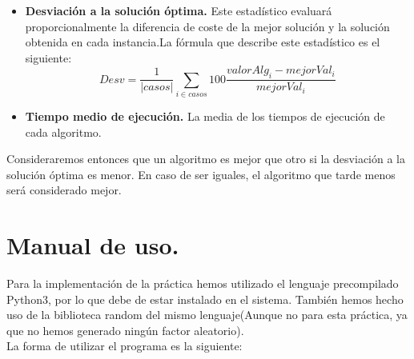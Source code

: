 \begin{itemize}
	\item \textbf{Desviación a la solución óptima.} Este estadístico evaluará proporcionalmente la diferencia de coste de la mejor solución y la solución obtenida en cada instancia.La fórmula que describe este estadístico es el siguiente:
	\[Desv = \dfrac{1}{ \left| casos\right|}\sum_{i \in casos}100\dfrac{valorAlg_i - mejorVal_i}{mejorVal_i} \]
	
	\item \textbf{Tiempo medio de ejecución.} La media de los tiempos de ejecución de cada algoritmo.
\end{itemize}

Consideraremos entonces que un algoritmo es mejor que otro si la desviación a la solución óptima es menor. En caso de ser iguales, el algoritmo que tarde menos será considerado mejor.


\newpage

\section{Manual de uso.}

Para la implementación de la práctica hemos utilizado el lenguaje precompilado Python3, por lo que debe de estar instalado en el sistema. También hemos hecho uso de la biblioteca random del mismo lenguaje(Aunque no para esta práctica, ya que no hemos generado ningún factor aleatorio).\\

La forma de utilizar el programa es la siguiente:\\

